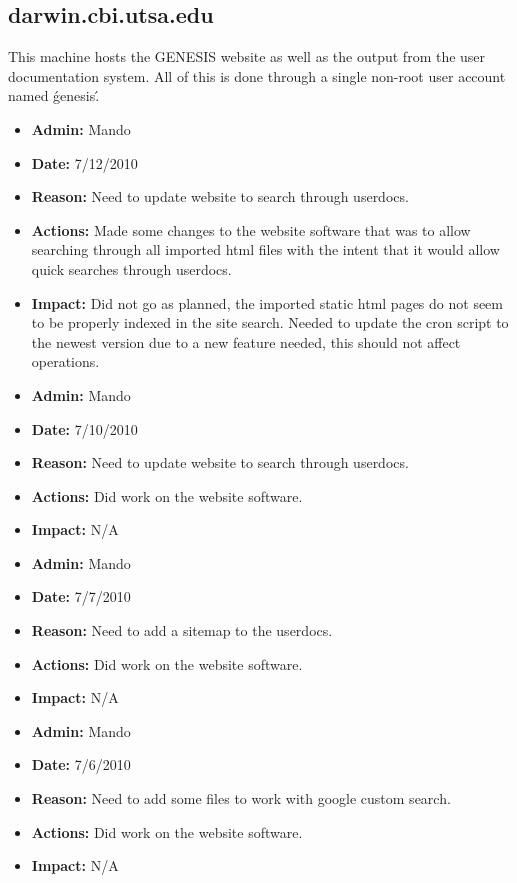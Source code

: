 \documentclass[12pt]{article}
\begin{document}
\subsection*{darwin.cbi.utsa.edu}

This machine hosts the GENESIS website as well as the output from the user documentation system. All of this is done through a single non-root user account named \'genesis\'.

\begin{itemize}
\item[] {\bf Admin:} Mando
\item[] {\bf Date:} 7/12/2010
\item[] {\bf Reason:} Need to update website to search through userdocs. 
\item[] {\bf Actions:} Made some changes to the website software that was to allow searching through all imported html files with the intent that it would allow quick searches through userdocs.  
\item[] {\bf Impact:} Did not go as planned, the imported static html pages do not seem to be properly indexed in the site search. Needed to update the cron script to the newest version due to a new feature needed, this should not affect operations.
\end{itemize}

\begin{itemize}
\item[] {\bf Admin:} Mando
\item[] {\bf Date:} 7/10/2010
\item[] {\bf Reason:} Need to update website to search through userdocs. 
\item[] {\bf Actions:} Did work on the website software. 
\item[] {\bf Impact:} N/A
\end{itemize}

\begin{itemize}
\item[] {\bf Admin:} Mando
\item[] {\bf Date:} 7/7/2010
\item[] {\bf Reason:} Need to add a sitemap to the userdocs.
\item[] {\bf Actions:} Did work on the website software. 
\item[] {\bf Impact:} N/A
\end{itemize}

\begin{itemize}
\item[] {\bf Admin:} Mando
\item[] {\bf Date:} 7/6/2010
\item[] {\bf Reason:} Need to add some files to work with google custom search.
\item[] {\bf Actions:} Did work on the website software. 
\item[] {\bf Impact:} N/A
\end{itemize}
\end{document}
